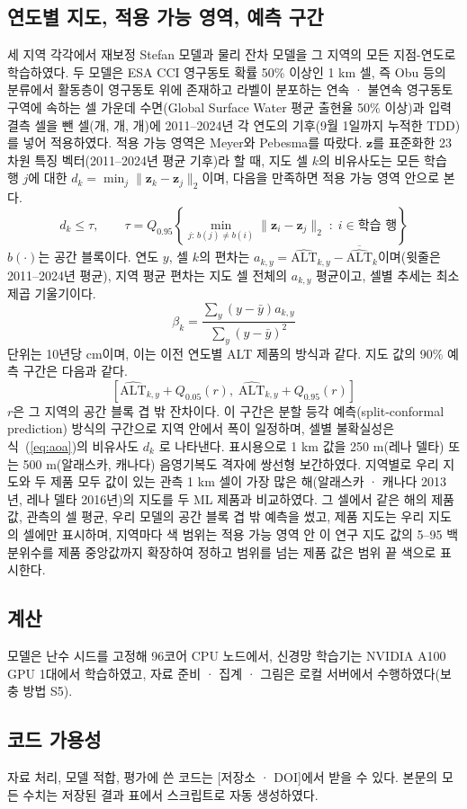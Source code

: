 \subsection{연도별 지도, 적용 가능 영역, 예측 구간}
세 지역 각각에서 재보정 Stefan 모델과 물리 잔차 모델을 그 지역의 모든 지점-연도로 학습하였다. 두 모델은 ESA CCI 영구동토 확률 50\% 이상인 1 km 셀, 즉 Obu 등\cite{Obu2019}의 분류에서 활동층이 영구동토 위에 존재하고 라벨이 분포하는 연속 · 불연속 영구동토 구역에 속하는 셀 가운데 수면(Global Surface Water 평균 출현율 50\% 이상)과 입력 결측 셀을 뺀 셀(\nncellmapAk{}개, \nncellmapLe{}개, \nncellmapCa{}개)에 2011--2024년 각 연도의 기후(9월 1일까지 누적한 TDD)를 넣어 적용하였다. 적용 가능 영역은 Meyer와 Pebesma\cite{MeyerPebesma2021}를 따랐다. $\mathbf{z}$를 표준화한 23차원 특징 벡터(2011--2024년 평균 기후)라 할 때, 지도 셀 $k$의 비유사도는 모든 학습 행 $j$에 대한 $d_k = \min_{j} \lVert \mathbf{z}_k - \mathbf{z}_j \rVert_2$이며, 다음을 만족하면 적용 가능 영역 안으로 본다.
\begin{equation}
d_k \leq \tau, \qquad \tau = Q_{0.95}\!\left\{ \min_{j:\, b(j) \neq b(i)} \lVert \mathbf{z}_i - \mathbf{z}_j \rVert_2 \;:\; i \in \text{학습 행} \right\}
\label{eq:aoa}
\end{equation}
$b(\cdot)$는 공간 블록이다. 연도 $y$, 셀 $k$의 편차는 $a_{k,y} = \widehat{\mathrm{ALT}}_{k,y} - \overline{\widehat{\mathrm{ALT}}}_{k}$이며(윗줄은 2011--2024년 평균), 지역 평균 편차는 지도 셀 전체의 $a_{k,y}$ 평균이고, 셀별 추세는 최소제곱 기울기이다.
\begin{equation}
\beta_k = \frac{\sum_{y} \left( y - \bar{y} \right) a_{k,y}}{\sum_{y} \left( y - \bar{y} \right)^{2}}
\label{eq:trend}
\end{equation}
단위는 10년당 cm이며, 이는 이전 연도별 ALT 제품의 방식과 같다\cite{Liu2024,YiKimball2019}. 지도 값의 90\% 예측 구간은 다음과 같다.
\begin{equation}
\left[ \widehat{\mathrm{ALT}}_{k,y} + Q_{0.05}(r),\; \widehat{\mathrm{ALT}}_{k,y} + Q_{0.95}(r) \right]
\label{eq:pi}
\end{equation}
$r$은 그 지역의 공간 블록 겹 밖 잔차이다. 이 구간은 분할 등각 예측(split-conformal prediction) 방식의 구간\cite{Lei2018}으로 지역 안에서 폭이 일정하며, 셀별 불확실성은 식~(\ref{eq:aoa})의 비유사도 $d_k$ 로 나타낸다. 표시용으로 1 km 값을 250 m(레나 델타) 또는 500 m(알래스카, 캐나다) 음영기복도 격자에 쌍선형 보간하였다. 지역별로 우리 지도와 두 제품 모두 값이 있는 관측 1 km 셀이 가장 많은 해(알래스카 · 캐나다 2013년, 레나 델타 2016년)의 지도를 두 ML 제품과 비교하였다. 그 셀에서 같은 해의 제품 값, 관측의 셀 평균, 우리 모델의 공간 블록 겹 밖 예측을 썼고, 제품 지도는 우리 지도의 셀에만 표시하며, 지역마다 색 범위는 적용 가능 영역 안 이 연구 지도 값의 5--95 백분위수를 제품 중앙값까지 확장하여 정하고 범위를 넘는 제품 값은 범위 끝 색으로 표시한다.

\subsection{계산}
모델은 난수 시드를 고정해 96코어 CPU 노드에서, 신경망 학습기는 NVIDIA A100 GPU 1대에서 학습하였고, 자료 준비 · 집계 · 그림은 로컬 서버에서 수행하였다(보충 방법 S5).

\subsection{코드 가용성}
자료 처리, 모델 적합, 평가에 쓴 코드는 [저장소 · DOI]에서 받을 수 있다. 본문의 모든 수치는 저장된 결과 표에서 스크립트로 자동 생성하였다.
